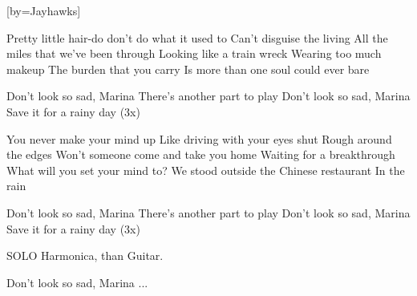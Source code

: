


[by=Jayhawks]

\begin{LARGE}



\beginverse
Pretty little hair-do don't do what it used to
Can't disguise the living
All the miles that we've been through
Looking like a train wreck
Wearing too much makeup
The burden that you carry
Is more than one soul could ever bare
\endverse

\beginchorus
Don't look so sad, Marina
There's another part to play
Don't look so sad, Marina
Save it for a rainy day  (3x)
\endchorus

\beginverse
You never make your mind up
Like driving with your eyes shut
Rough around the edges
Won't someone come and take you home
Waiting for a breakthrough
What will you set your mind to?
We stood outside the Chinese restaurant
In the rain
\endverse

\beginchorus
Don't look so sad, Marina
There's another part to play
Don't look so sad, Marina
Save it for a rainy day  (3x)
\endchorus

\beginchorus
SOLO Harmonica, than Guitar.
\endchorus

\beginchorus
Don't look so sad, Marina ...
\endchorus


\end{LARGE}

\chordson
\endsong
